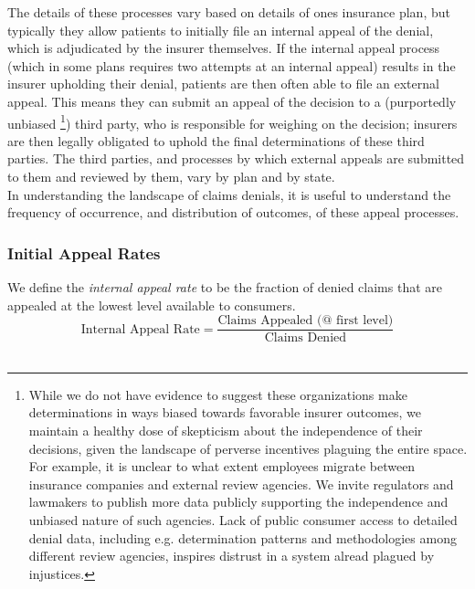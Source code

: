 \documentclass[12pt, a4paper,twoside]{report}
\theoremstyle{plain} %
\theoremstyle{definition} %
\theoremstyle{remark} %
\numberwithin{equation}{chapter}
\begin{document}
		The details of these processes vary based on details of ones insurance plan, but typically they allow patients to initially file an internal appeal of the denial, which is adjudicated by the insurer themselves. If the internal appeal process (which in some plans requires two attempts at an internal appeal) results in the insurer upholding their denial, patients are then often able to file an external appeal. This means they can submit an appeal of the decision to a (purportedly unbiased \footnote{While we do not have evidence to suggest these organizations make determinations in ways biased towards favorable insurer outcomes, we maintain a healthy dose of skepticism about the independence of their decisions, given the landscape of perverse incentives plaguing the entire space. For example, it is unclear to what extent employees migrate between insurance companies and external review agencies. We invite regulators and lawmakers to publish more data publicly supporting the independence and unbiased nature of such agencies. Lack of public consumer access to detailed denial data, including e.g. determination patterns and methodologies among different review agencies, inspires distrust in a system alread plagued by injustices.}) third party, who is responsible for weighing on the decision; insurers are then legally obligated to uphold the final determinations of these third parties. The third parties, and processes by which external appeals are submitted to them and reviewed by them, vary by plan and by state.\\
		
		In understanding the landscape of claims denials, it is useful to understand the frequency of occurrence, and distribution of outcomes, of these appeal processes.\\
		
		\subsubsection{Initial Appeal Rates}
		
		We define the \emph{internal appeal rate} to be the fraction of denied claims that are appealed at the lowest level available to consumers.\\
		
		\begin{equation*}
			\text{Internal Appeal Rate} = \dfrac{\text{Claims Appealed (@ first level)}}{\text{Claims Denied}}
		\end{equation*}
		\hfill\\
		
\end{document}
